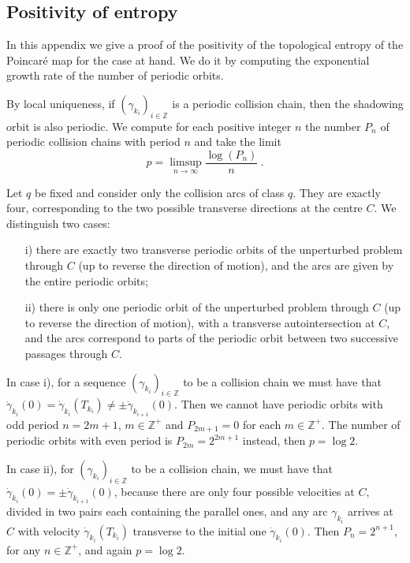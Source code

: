 \documentclass[a4paper]{article}
\begin{document}
\appendix
\begin{footnotesize}
\section{Positivity of entropy}
\label{app:entropy}

In this appendix we give a proof of the positivity of the topological
entropy of the Poincar\'e map for the case at hand.  We do it by
computing the exponential growth rate of the number of periodic
orbits.

By local uniqueness, if $(\gamma_{k_i})_{i \in {\mathbb{Z}}}$ is a periodic
collision chain, then the shadowing orbit is also periodic. We
compute for each positive integer $n$ the number $P_n$ of periodic
collision chains with period $n$ and take the limit
\[
p=\limsup_{n \rightarrow \infty} \frac{\log (P_n)}{n}\ .
\] 

Let $q$ be fixed and consider only the collision arcs of class $q$.
They are exactly four, corresponding to the two possible transverse
directions at the centre $C$. We distinguish two cases:
\begin{itemize}
\item[i)] there are exactly two transverse periodic orbits of the
  unperturbed problem through $C$ (up to reverse the direction of
  motion), and the arcs are given by the entire periodic orbits;
\item[ii)] there is only one periodic orbit of the unperturbed problem
  through $C$ (up to reverse the direction of motion), with a
  transverse autointersection at $C$, and the arcs correspond to parts
  of the periodic orbit between two successive passages through $C$.
\end{itemize}

In case i), for a sequence $(\gamma_{k_i})_{i \in {\mathbb{Z}}}$ to be a
collision chain we must have that $\dot \gamma_{k_i}(0)=\dot
\gamma_{k_i}(T_{k_i})\neq \pm \dot \gamma_{k_{i+1}}(0)$. Then we
cannot have periodic orbits with odd period $n=2m+1$, $m \in {\mathbb{Z}}^+$ and
$P_{2m+1}=0$ for each $m \in {\mathbb{Z}}^+$. The number of periodic orbits with
even period is $P_{2m}=2^{2m+1}$ instead, then $p=\log 2$.

In case ii), for $(\gamma_{k_i})_{i \in {\mathbb{Z}}}$ to be a collision chain,
we must have that $\dot \gamma_{k_i}(0)=\pm \dot \gamma_{k_{i+1}}(0)$,
because there are only four possible velocities at $C$, divided in two
pairs each containing the parallel ones, and any arc $\gamma_{k_i}$
arrives at $C$ with velocity $\dot \gamma_{k_i}(T_{k_i})$ transverse
to the initial one $\dot \gamma_{k_{i}}(0)$. Then $P_n=2^{n+1}$, for
any $n \in {\mathbb{Z}}^+$, and again $p=\log 2$.


\end{footnotesize}
\end{document}
